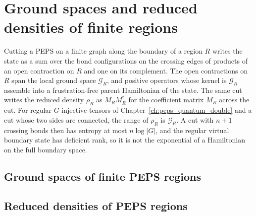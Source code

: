 \chapter{Ground spaces and reduced densities of finite regions}%
\label{ch:peps_regions}

Cutting a PEPS on a finite graph along the boundary of a region $R$ writes the
state as a sum over the bond configurations on the crossing edges of products
of an open contraction on $R$ and one on its complement. The open contractions
on $R$ span the local ground space $\mathcal G_R$, and positive operators whose
kernel is $\mathcal G_R$ assemble into a frustration-free parent Hamiltonian
of the state. The same cut writes the reduced density $\rho_R$ as $M_RM_R^\dagger$
for the coefficient matrix $M_R$ across the cut. For regular $G$-injective
tensors of Chapter~\ref{ch:peps_quantum_double} and a cut whose two sides are
connected, the range of $\rho_R$ is $\mathcal G_R$. A cut with $n+1$ crossing
bonds then has entropy at most $n\log|G|$, and the regular virtual boundary
state has deficient rank, so it is not the exponential of a Hamiltonian on the
full boundary space.

\section{Ground spaces of finite PEPS regions}%
\label{sec:peps_region_ground_spaces}




\section{Reduced densities of PEPS regions}%
\label{sec:peps_region_reduced_densities}





















